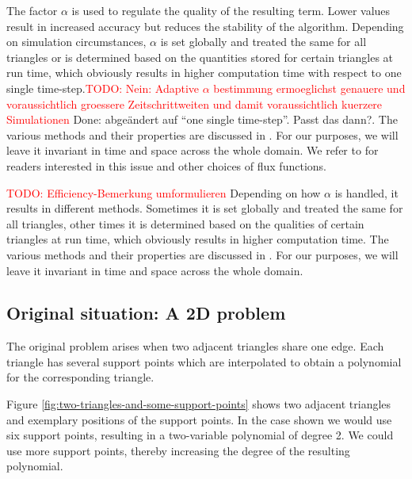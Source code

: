 \documentclass{article}
\newcommand{\todo}[2][]{\textcolor{red}{TODO\ifthenelse{\equal{#1}{}}{}{[#1]}: #2}}
\newcommand{\done}[2][]{\textcolor{green!50!black}{Done\ifthenelse{\equal{#1}{}}{}{[#1]}: #2}}
\begin{document}
The factor $\alpha$ is used to regulate the quality of the resulting term.
Lower values result in increased accuracy but reduces the stability of the algorithm.
Depending on simulation circumstances, $\alpha$ is set globally and treated the same for all triangles or is determined based on the quantities stored for certain triangles at run time, which obviously results in higher computation time with respect to one single time-step.\todo{Nein: Adaptive $\alpha$ bestimmung ermoeglichst genauere und voraussichtlich groessere Zeitschrittweiten und damit voraussichtlich kuerzere Simulationen} \done[Philipp]{abgeändert auf ``one single time-step''. Passt das dann?}. The various methods and their properties are discussed in \cite{leveque2002finite}.
For our purposes, we will leave it invariant in time and space across the whole domain.
We refer to \cite{cockburn1999discontinuous,leveque2002finite} for readers interested in this issue and other choices of flux functions.

\todo{Efficiency-Bemerkung umformulieren}
Depending on how $\alpha$ is handled, it results in different methods. Sometimes it is set globally and treated the same for all triangles, other times it is determined based on the qualities of certain triangles at run time, which obviously results in higher computation time. The various methods and their properties are discussed in \cite{leveque2002finite}. For our purposes, we will leave it invariant in time and space across the whole domain.

\subsection{Original situation: A 2D problem}
\label{sec:original-situation-2d-problem}

The original problem arises when two adjacent triangles share one edge.
Each triangle has several support points which are interpolated to obtain a polynomial for the corresponding triangle.

Figure \ref{fig:two-triangles-and-some-support-points} shows two adjacent triangles and exemplary positions of the support points.
In the case shown we would use six support points, resulting in a two-variable polynomial of degree 2. We could use more support points, thereby increasing the degree of the resulting polynomial.
\end{document}
